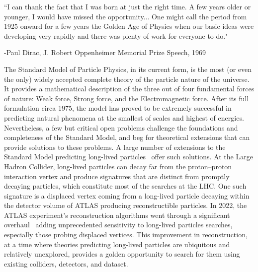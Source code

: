\vspace{1in}
{
``I can thank the fact that I was born at just the right time. A few years older or younger, I would have missed the opportunity... One might call the period from 1925 onward for a few years the Golden Age of Physics when our basic ideas were developing very rapidly and there was plenty of work for everyone to do."

\hfill -Paul Dirac, J. Robert Oppenheimer Memorial Prize Speech, 1969}
\vspace{1in}

The Standard Model of Particle Physics, in its current form, is the most (or even the only) widely accepted complete theory of the particle nature of the universe. It provides a mathematical description of the three out of four fundamental forces of nature: Weak force, Strong force, and the Electromagnetic force. After its full formulation circa 1975, the model has proved to be extremely successful in predicting natural phenomena at the smallest of scales and highest of energies. Nevertheless, a few but critical open problems challenge the foundations and completeness of the Standard Model, and beg for theoretical extensions that can provide solutions to these problems. A large number of extensions to the Standard Model predicting long-lived particles~\cite{Curtin_2019, Alimena_2020} offer such solutions. At the Large Hadron Collider, long-lived particles can decay far from the proton--proton interaction vertex and produce signatures that are distinct from promptly decaying particles, which constitute most of the searches at the LHC. One such signature is a displaced vertex coming from a long-lived particle decaying within the detector volume of ATLAS producing reconstructible particles. In 2022, the ATLAS experiment's reconstruction algorithms went through a significant overhaul~\cite{atlascollaboration2023software, IDTR-2021-03} adding unprecedented sensitivity to long-lived particles searches, especially those probing displaced vertices. This improvement in reconstruction, at a time where theories predicting long-lived particles are ubiquitous and relatively unexplored, provides a golden opportunity to search for them using existing colliders, detectors, and dataset.


